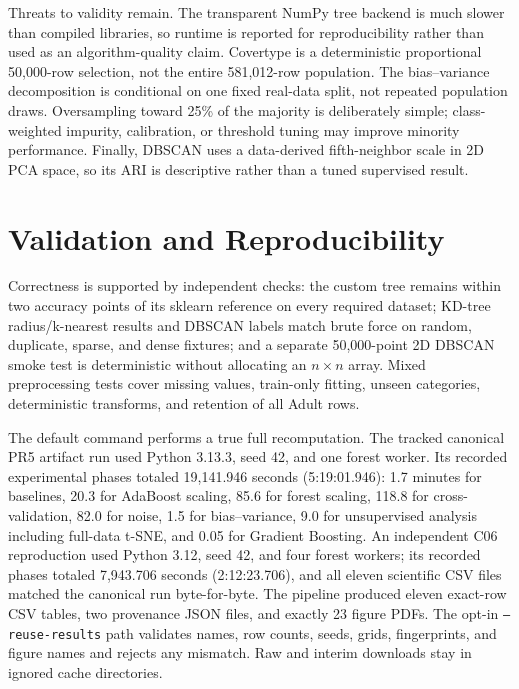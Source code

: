\documentclass[conference]{IEEEtran}
\begin{document}
Threats to validity remain. The transparent NumPy tree backend is much slower
than compiled libraries, so runtime is reported for reproducibility rather
than used as an algorithm-quality claim. Covertype is a deterministic
proportional 50,000-row selection, not the entire 581,012-row population.
The bias--variance decomposition is conditional on one fixed real-data
split, not repeated population draws. Oversampling toward 25\% of the
majority is deliberately simple; class-weighted impurity, calibration, or
threshold tuning may improve minority performance. Finally, DBSCAN uses a
data-derived fifth-neighbor scale in 2D PCA space, so its ARI is descriptive
rather than a tuned supervised result.

\section{Validation and Reproducibility}
Correctness is supported by independent checks: the custom tree remains
within two accuracy points of its sklearn reference on every required
dataset; KD-tree radius/k-nearest results and DBSCAN labels match brute force
on random, duplicate, sparse, and dense fixtures; and a separate 50,000-point
2D DBSCAN smoke test is deterministic without allocating an $n\times n$
array. Mixed preprocessing tests cover missing values, train-only fitting,
unseen categories, deterministic transforms, and retention of all Adult rows.

The default command performs a true full recomputation. The tracked canonical
PR5 artifact run used Python 3.13.3, seed 42, and one forest worker. Its recorded
experimental phases totaled 19,141.946 seconds (5:19:01.946): 1.7 minutes for
baselines, 20.3 for AdaBoost scaling, 85.6 for forest scaling, 118.8 for
cross-validation, 82.0 for noise, 1.5 for bias--variance, 9.0 for unsupervised
analysis including full-data t-SNE, and 0.05 for Gradient Boosting. An
independent C06 reproduction used Python 3.12, seed 42, and four forest workers;
its recorded phases totaled 7,943.706 seconds (2:12:23.706), and all eleven
scientific CSV files matched the canonical run byte-for-byte. The pipeline
produced eleven exact-row CSV tables, two provenance JSON files, and exactly
23 figure PDFs. The opt-in \texttt{--reuse-results} path validates names, row
counts, seeds, grids, fingerprints, and figure names and rejects any mismatch.
Raw and interim downloads stay in ignored cache directories.
\end{document}
